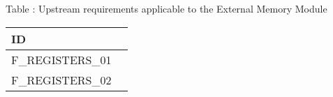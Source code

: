 {
  \vspace{0.5em}
  \begin{center}
    Table \thetable: Upstream requirements applicable to the External Memory Module\label{tab:regm-upstream-requirements}
  \end{center}
  
\footnotesize
\begin{xltabular}{0.9\textwidth}{|X|c|}
  \hline
  \textbf{ID} \\
  \hline
  F\_REGISTERS\_01 \\
  \hline
  F\_REGISTERS\_02 \\
  \hline
\end{xltabular}
}
